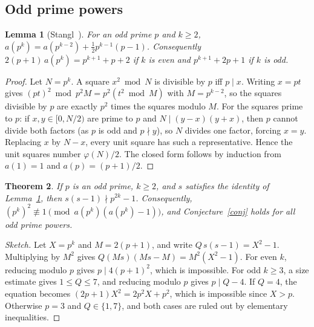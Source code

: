 \documentclass[11pt]{article}
\newtheorem{theorem}{Theorem}
\newtheorem{lemma}[theorem]{Lemma}
\theoremstyle{remark}\newtheorem{remark}[theorem]{Remark}
\begin{document}
\subsection{Odd prime powers}
\begin{lemma}[Stangl~\cite{stangl}]\label{stangl}
For an odd prime $p$ and $k\ge 2$, $a(p^k)=a(p^{k-2})+\tfrac12 p^{k-1}(p-1)$. Consequently $2(p+1)\,a(p^k)=p^{k+1}+p+2$ if $k$ is even and $p^{k+1}+2p+1$ if $k$ is odd.
\end{lemma}
\begin{proof}
Let $N=p^k$. A square $x^2 \bmod N$ is divisible by $p$ iff $p\mid x$. Writing $x=pt$ gives $(pt)^2 \bmod p^2M=p^2(t^2\bmod M)$ with $M=p^{k-2}$, so the squares divisible by $p$ are exactly $p^2$ times the squares modulo $M$. For the squares prime to $p$: if $x,y\in[0,N/2)$ are prime to $p$ and $N\mid (y-x)(y+x)$, then $p$ cannot divide both factors (as $p$ is odd and $p\nmid y$), so $N$ divides one factor, forcing $x=y$. Replacing $x$ by $N-x$, every unit square has such a representative. Hence the unit squares number $\varphi(N)/2$. The closed form follows by induction from $a(1)=1$ and $a(p)=(p+1)/2$.
\end{proof}
\begin{theorem}\label{pp}
If $p$ is an odd prime, $k\ge 2$, and $s$ satisfies the identity of Lemma~\ref{stangl}, then $s(s-1)\nmid p^{2k}-1$. Consequently, $(p^k)^2\not\equiv 1\pmod{a(p^k)(a(p^k)-1)}$, and Conjecture~\ref{conj} holds for all odd prime powers.
\end{theorem}
\begin{proof}[Sketch]
Let $X=p^k$ and $M=2(p+1)$, and write $Q\,s(s-1)=X^2-1$. Multiplying by $M^2$ gives $Q(Ms)(Ms-M)=M^2(X^2-1)$. For even $k$, reducing modulo $p$ gives $p\mid 4(p+1)^2$, which is impossible. For odd $k\ge 3$, a size estimate gives $1\le Q\le 7$, and reducing modulo $p$ gives $p\mid Q-4$. If $Q=4$, the equation becomes $(2p+1)X^2=2p^2X+p^2$, which is impossible since $X>p$. Otherwise $p=3$ and $Q\in\{1,7\}$, and both cases are ruled out by elementary inequalities.
\end{proof}
\end{document}
